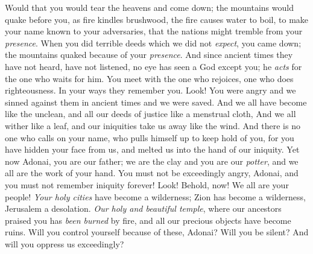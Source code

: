 \begin{biblechapter} %
\verse {} Would that you would tear the heavens and come down; 
the mountains would quake before you,
\verse {} as fire kindles brushwood, 
the fire causes water to boil, 
to make your name known to your adversaries, 
that the nations might tremble from your \textit{presence}.
\verse When you did terrible deeds which we did not \textit{expect}, you came down; 
the mountains quaked because of your \textit{presence}.
\verse And since ancient times they have not heard, 
have not listened, 
no eye has seen a God except you; 
he \textit{acts} for the one who waits for him.
\verse You meet with the one who rejoices, 
one who does righteousness. 
In your ways they remember you. 
Look! You were angry and we sinned against them in ancient times and we were saved.
\verse And we all have become like the unclean, 
and all our deeds of justice like a menstrual cloth, 
And we all wither like a leaf, 
and our iniquities take us away like the wind.
\verse And there is no one who calls on your name, 
who pulls himself up to keep hold of you, 
for you have hidden your face from us, 
and melted us into the hand of our iniquity.
\verse Yet now Adonai, you are our father; 
we are the clay and you are our \textit{potter}, 
and we all are the work of your hand.
\verse You must not be exceedingly angry, Adonai, 
and you must not remember iniquity forever! Look! Behold, now! We all are your people!
\verse \textit{Your holy cities} have become a wilderness; 
Zion has become a wilderness, Jerusalem a desolation.
\verse \textit{Our holy and beautiful temple}, where our ancestors praised you has \textit{been burned} by fire, 
and all our precious objects have become ruins.
\verse Will you control yourself because of these, Adonai? 
Will you be silent? 
And will you oppress us exceedingly?
\end{biblechapter}

